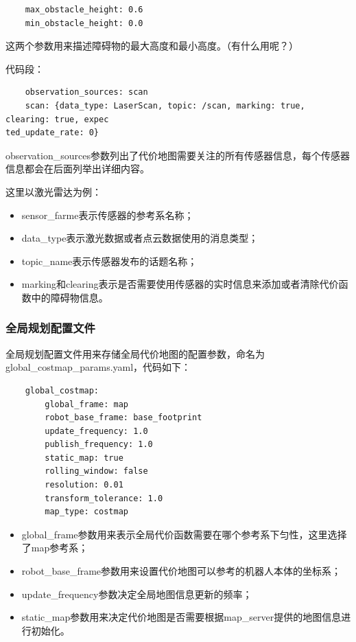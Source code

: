 \documentclass[10pt, oneside]{book}
\begin{document}
\begin{verbatim}
    max_obstacle_height: 0.6
    min_obstacle_height: 0.0
\end{verbatim}

这两个参数用来描述障碍物的最大高度和最小高度。（\textcolor[rgb]{1,0,0}{有什么用呢？}）

代码段：

\begin{verbatim}
    observation_sources: scan
    scan: {data_type: LaserScan, topic: /scan, marking: true, clearing: true, expec
ted_update_rate: 0}
\end{verbatim}

observation\_sources参数列出了代价地图需要关注的所有传感器信息，每个传感器信息都会在后面列举出详细内容。

这里以激光雷达为例：

\begin{itemize}
    \item sensor\_farme表示传感器的参考系名称；
    \item data\_type表示激光数据或者点云数据使用的消息类型；
    \item topic\_name表示传感器发布的话题名称；
    \item marking和clearing表示是否需要使用传感器的实时信息来添加或者清除代价函数中的障碍物信息。
\end{itemize}

\subsubsection{全局规划配置文件}

全局规划配置文件用来存储全局代价地图的配置参数，命名为global\_costmap\_params.yaml，代码如下：

\begin{verbatim}
    global_costmap:
        global_frame: map
        robot_base_frame: base_footprint
        update_frequency: 1.0
        publish_frequency: 1.0
        static_map: true
        rolling_window: false
        resolution: 0.01
        transform_tolerance: 1.0
        map_type: costmap
 \end{verbatim}

\begin{itemize}
    \item global\_frame参数用来表示全局代价函数需要在哪个参考系下匀性，这里选择了map参考系；
    \item robot\_base\_frame参数用来设置代价地图可以参考的机器人本体的坐标系；
    \item update\_frequency参数决定全局地图信息更新的频率；
    \item static\_map参数用来决定代价地图是否需要根据map\_server提供的地图信息进行初始化。
\end{itemize}
\end{document}
